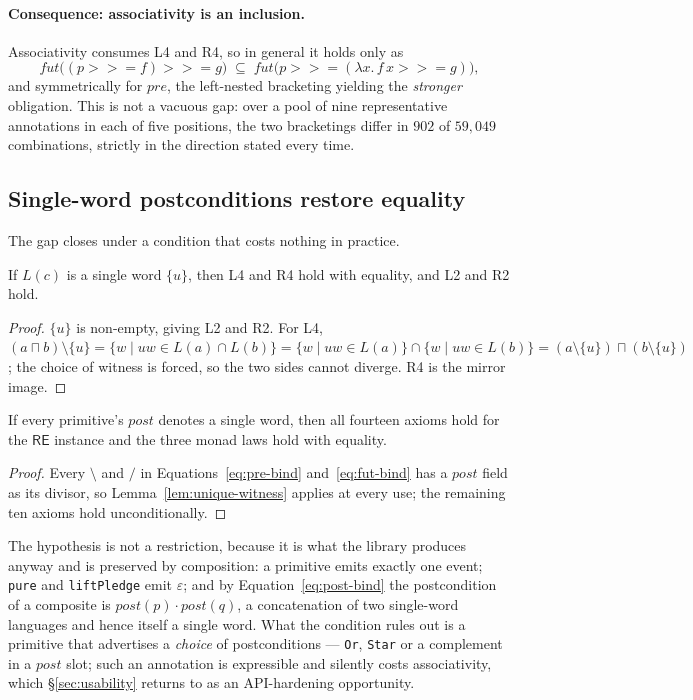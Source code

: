 \documentclass[acmsmall,screen]{acmart}
\newcommand{\RE}{\mathsf{RE}}
\newcommand{\pre}{\mathit{pre}}
\newcommand{\post}{\mathit{post}}
\newcommand{\fut}{\mathit{fut}}
\newcommand{\lquot}{\mathbin{\setminus}}   %
\newcommand{\rquot}{\mathbin{/}}           %
\begin{document}
\paragraph{Consequence: associativity is an inclusion.}
Associativity consumes L4 and R4, so in general it holds only as
\[
  \fut\bigl((p \mathbin{>\!\!>\!\!=} f) \mathbin{>\!\!>\!\!=} g\bigr)
  \;\subseteq\;
  \fut\bigl(p \mathbin{>\!\!>\!\!=} (\lambda x.\, f\,x \mathbin{>\!\!>\!\!=} g)\bigr),
\]
and symmetrically for $\pre$, the left-nested bracketing yielding the
\emph{stronger} obligation.
This is not a vacuous gap: over a pool of nine representative annotations in
each of five positions, the two bracketings differ in $902$ of $59{,}049$
combinations, strictly in the direction stated every time.

\subsection{Single-word postconditions restore equality}
\label{sec:single-word}

The gap closes under a condition that costs nothing in practice.

\begin{lemma}
\label{lem:unique-witness}
If $L(c)$ is a single word $\{u\}$, then L4 and R4 hold with equality, and
L2 and R2 hold.
\end{lemma}
\begin{proof}
$\{u\}$ is non-empty, giving L2 and R2.
For L4, $(a \sqcap b) \lquot \{u\} = \{w \mid uw \in L(a) \cap L(b)\}
= \{w \mid uw \in L(a)\} \cap \{w \mid uw \in L(b)\}
= (a \lquot \{u\}) \sqcap (b \lquot \{u\})$;
the choice of witness is forced, so the two sides cannot diverge.
R4 is the mirror image.
\end{proof}

\begin{theorem}
\label{thm:single-word}
If every primitive's $\post$ denotes a single word, then all fourteen axioms
hold for the $\RE$ instance and the three monad laws hold with equality.
\end{theorem}
\begin{proof}
Every $\lquot$ and $\rquot$ in Equations~\eqref{eq:pre-bind}
and~\eqref{eq:fut-bind} has a $\post$ field as its divisor, so
Lemma~\ref{lem:unique-witness} applies at every use; the remaining ten
axioms hold unconditionally.
\end{proof}

The hypothesis is not a restriction, because it is what the library
produces anyway and is preserved by composition: a primitive emits exactly
one event; \lstinline{pure} and \lstinline{liftPledge} emit $\varepsilon$;
and by Equation~\eqref{eq:post-bind} the postcondition of a composite is
$\post(p) \cdot \post(q)$, a concatenation of two single-word languages and
hence itself a single word.
What the condition rules out is a primitive that advertises a \emph{choice}
of postconditions --- \lstinline{Or}, \lstinline{Star} or a complement in a
$\post$ slot; such an annotation is expressible and silently costs
associativity, which \S\ref{sec:usability} returns to as an API-hardening
opportunity.
\end{document}
